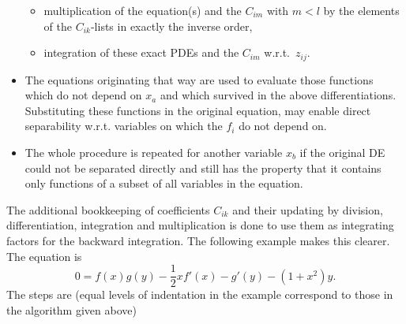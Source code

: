 \documentclass[12pt]{article}
\begin{document}
\begin{itemize}
 \begin{itemize}
  \item multiplication of the equation(s) and the $C_{im}$ with 
        $m<l$ by the elements
  of the $C_{ik}$-lists in exactly the inverse order,
  \item integration of these exact PDEs and the $C_{im}$ w.r.t.\ $z_{ij}$.
 \end{itemize}
 \item The equations originating that way are used to evaluate those
 functions which do not depend on $x_a$ and which survived in the above
 differentiations. Substituting these functions in the original equation,
 may enable direct separability w.r.t. variables on which the $f_i$
 do not depend on.
 \item The whole procedure is repeated for another variable $x_b$ if the
 original DE could not be separated directly and still has the property that 
 it contains only functions of a subset of all variables in the equation.
\end{itemize}
The additional bookkeeping of coefficients $C_{ik}$ and their updating by
division, differentiation, integration and multiplication is done to use
them as integrating factors for the backward integration.
The following example makes this clearer. The equation is
\begin{equation}
0 = f(x) g(y) - \frac{1}{2}xf'(x) - g'(y) - (1+x^2)y. \label{isep}
\end{equation}
The steps are (equal levels of indentation in the example correspond to
those in the algorithm given above)
\end{document}
